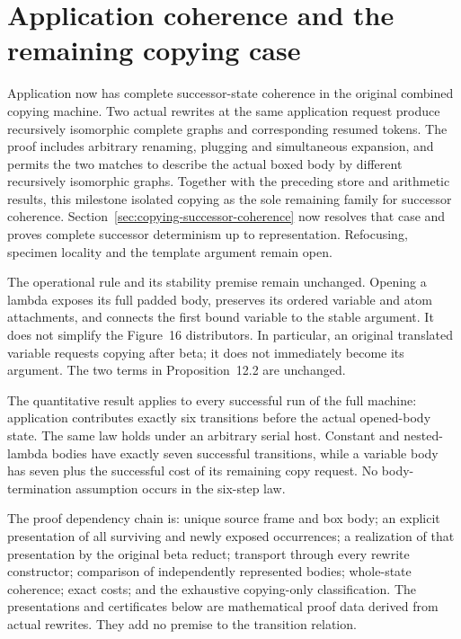 \clearpage
\section{Application coherence and the remaining copying case}
\label{sec:copying-application-coherence}
Application now has complete successor-state coherence in the original combined
copying machine. Two actual rewrites at the same application request produce
recursively isomorphic complete graphs and corresponding resumed tokens.
The proof includes arbitrary renaming, plugging and simultaneous expansion,
and permits the two matches to describe the actual boxed body by different
recursively isomorphic graphs. Together with the preceding store and arithmetic
results, this milestone isolated copying as the sole remaining family for
successor coherence. Section~\ref{sec:copying-successor-coherence} now resolves
that case and proves complete successor determinism up to representation.
Refocusing, specimen locality and the template argument remain open.

The operational rule and its stability premise remain unchanged. Opening a
lambda exposes its full padded body, preserves its ordered variable and atom
attachments, and connects the first bound variable to the stable argument.
It does not simplify the Figure~16 distributors. In particular, an original
translated variable requests copying after beta; it does not immediately
become its argument. The two terms in Proposition~12.2 are unchanged.

The quantitative result applies to every successful run of the full machine:
application contributes exactly six transitions before the actual opened-body
state. The same law holds under an arbitrary serial host. Constant and
nested-lambda bodies have exactly seven successful transitions, while a
variable body has seven plus the successful cost of its remaining copy request.
No body-termination assumption occurs in the six-step law.

The proof dependency chain is: unique source frame and box body; an explicit
presentation of all surviving and newly exposed occurrences; a realization of
that presentation by the original beta reduct; transport through every rewrite
constructor; comparison of independently represented bodies; whole-state
coherence; exact costs; and the exhaustive copying-only classification.
The presentations and certificates below are mathematical proof data derived
from actual rewrites. They add no premise to the transition relation.

